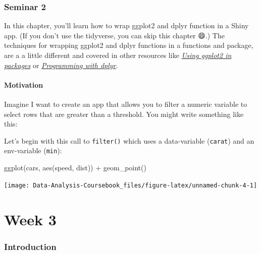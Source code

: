 \documentclass[
]{article}
\newenvironment{Shaded}{\begin{snugshade}}{\end{snugshade}}
\newcommand{\FunctionTok}[1]{\textcolor[rgb]{0.00,0.00,0.00}{#1}}
\newcommand{\NormalTok}[1]{#1}
\newcommand{\SpecialCharTok}[1]{\textcolor[rgb]{0.00,0.00,0.00}{#1}}
\begin{document}
\hypertarget{seminar2}{%
\section{Seminar 2}\label{seminar2}}

In this chapter, you'll learn how to wrap ggplot2 and dplyr function in a Shiny app.
(If you don't use the tidyverse, you can skip this chapter 😄.) The techniques for wrapping ggplot2 and dplyr functions in a functions and package, are a a little different and covered in other resources like \href{http://ggplot2.tidyverse.org/dev/articles/ggplot2-in-packages.html}{\emph{Using ggplot2 in packages}} or \href{http://dplyr.tidyverse.org/articles/programming.html}{\emph{Programming with dplyr}}.

\hypertarget{tidy-motivation}{%
\subsection{Motivation}\label{tidy-motivation}}

Imagine I want to create an app that allows you to filter a numeric variable to select rows that are greater than a threshold.
You might write something like this:

Let's begin with this call to \texttt{filter()} which uses a data-variable (\texttt{carat}) and an env-variable (\texttt{min}):

\begin{Shaded}
\begin{Highlighting}[]
\FunctionTok{ggplot}\NormalTok{(cars, }\FunctionTok{aes}\NormalTok{(speed, dist)) }\SpecialCharTok{+} 
  \FunctionTok{geom\_point}\NormalTok{()}
\end{Highlighting}
\end{Shaded}

\begin{center}\texttt{[image: Data-Analysis-Coursebook\_files/figure-latex/unnamed-chunk-4-1]} \end{center}

\hypertarget{part-week-3}{%
\part*{Week 3}\label{part-week-3}}

\hypertarget{week3-intro}{%
\section*{Introduction}\label{week3-intro}}
\end{document}
